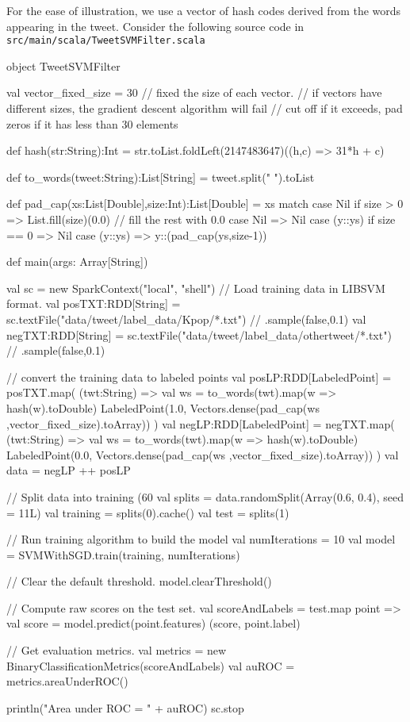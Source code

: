 \documentclass[10pt]{article}
\begin{document}
For the ease of illustration, we use a vector of hash codes derived
from the words appearing in the tweet.  Consider the following source
code in \\ {\tt src/main/scala/TweetSVMFilter.scala} 

\begin{code}
object TweetSVMFilter {

  val vector_fixed_size = 30 
  // fixed the size of each vector. 
  // if vectors have different sizes, the gradient descent algorithm will fail
  // cut off if it exceeds, pad zeros if it has less than 30 elements

  def hash(str:String):Int = str.toList.foldLeft(2147483647)((h,c) => 31*h + c)
  
  def to_words(tweet:String):List[String] = tweet.split(" ").toList

  def pad_cap(xs:List[Double],size:Int):List[Double] = xs match 
  {
    case Nil if size > 0 => List.fill(size)(0.0) // fill the rest with 0.0
    case Nil             => Nil 
    case (y::ys) if size == 0 => Nil
    case (y::ys)              => y::(pad_cap(ys,size-1))
  }

  def main(args: Array[String]) {
     
    val sc = new SparkContext("local", "shell")
    // Load training data in LIBSVM format.
    val posTXT:RDD[String] = sc.textFile("data/tweet/label_data/Kpop/*.txt") // .sample(false,0.1)
    val negTXT:RDD[String] = sc.textFile("data/tweet/label_data/othertweet/*.txt") // .sample(false,0.1)
    
    // convert the training data to labeled points
    val posLP:RDD[LabeledPoint] = posTXT.map( (twt:String) => 
    {
      val ws = to_words(twt).map(w => hash(w).toDouble)
      LabeledPoint(1.0, Vectors.dense(pad_cap(ws ,vector_fixed_size).toArray))
    })
    val negLP:RDD[LabeledPoint] = negTXT.map( (twt:String) => 
    { 
      val ws = to_words(twt).map(w => hash(w).toDouble)
      LabeledPoint(0.0, Vectors.dense(pad_cap(ws ,vector_fixed_size).toArray))
    })
    val data = negLP ++ posLP

    // Split data into training (60%
    val splits = data.randomSplit(Array(0.6, 0.4), seed = 11L)
    val training = splits(0).cache()
    val test = splits(1)

    // Run training algorithm to build the model
    val numIterations = 10
    val model = SVMWithSGD.train(training, numIterations)

    // Clear the default threshold.
    model.clearThreshold()

    // Compute raw scores on the test set. 
    val scoreAndLabels = test.map { point =>
      val score = model.predict(point.features)
      (score, point.label)
    }

    // Get evaluation metrics.
    val metrics = new BinaryClassificationMetrics(scoreAndLabels)
    val auROC = metrics.areaUnderROC()

    println("Area under ROC = " + auROC)	
    sc.stop
  }
}
\end{code}
\end{document}
